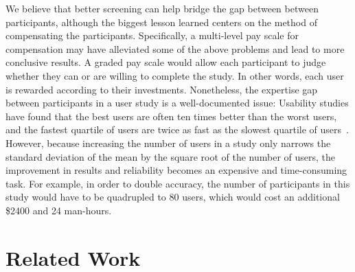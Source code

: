 \documentclass[times, 10pt,twocolumn]{article}
\begin{document}
We  believe that  better screening  can  help bridge  the gap  between
between participants, although the biggest lesson learned centers on the
method of compensating  the participants.  Specifically, a multi-level
pay  scale for  compensation may  have  alleviated some  of the  above
problems and lead to more conclusive results. A graded pay scale would
allow each  participant to  judge whether they  can or are  willing to
complete the study. In other words, each user is rewarded according to
their   investments.    Nonetheless,   the   expertise   gap   between
participants  in a user  study is  a well-documented  issue: Usability
studies have found that the best users are often ten times better than
the worst users,  and the fastest quartile of users  are twice as fast
as   the  slowest   quartile   of  users~\cite{controlled-experiments,
research-issues}.  However, because increasing  the number of users in
a study only narrows the standard  deviation of the mean by the square
root   of  the   number  of   users\cite{controlled-experiments},  the
improvement  in  results  and  reliability  becomes  an  expensive  and
time-consuming task.   For example, in  order to double  accuracy, the
number of participants in this study would have to be quadrupled to 80
users, which would cost an additional \$2400 and 24 man-hours.



\section{Related Work}
\label{sec:rw}
\end{document}
